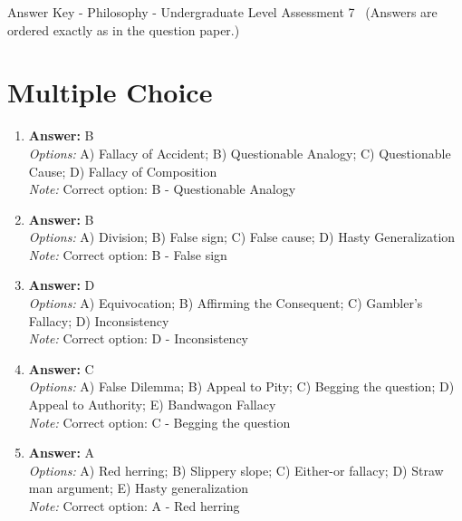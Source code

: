 \documentclass[12pt]{article}
\begin{document}
\begin{center}
Answer Key - Philosophy - Undergraduate Level Assessment 7 \
\small (Answers are ordered exactly as in the question paper.)
\end{center}

\section*{Multiple Choice}
\begin{enumerate}[label=\arabic*.]
\item \textbf{Answer:} B
\\ \textit{Options:} A) Fallacy of Accident; B) Questionable Analogy; C) Questionable Cause; D) Fallacy of Composition
\\ \textit{Note:} Correct option: B - Questionable Analogy
\item \textbf{Answer:} B
\\ \textit{Options:} A) Division; B) False sign; C) False cause; D) Hasty Generalization
\\ \textit{Note:} Correct option: B - False sign
\item \textbf{Answer:} D
\\ \textit{Options:} A) Equivocation; B) Affirming the Consequent; C) Gambler's Fallacy; D) Inconsistency
\\ \textit{Note:} Correct option: D - Inconsistency
\item \textbf{Answer:} C
\\ \textit{Options:} A) False Dilemma; B) Appeal to Pity; C) Begging the question; D) Appeal to Authority; E) Bandwagon Fallacy
\\ \textit{Note:} Correct option: C - Begging the question
\item \textbf{Answer:} A
\\ \textit{Options:} A) Red herring; B) Slippery slope; C) Either-or fallacy; D) Straw man argument; E) Hasty generalization
\\ \textit{Note:} Correct option: A - Red herring
\end{enumerate}
\end{document}
